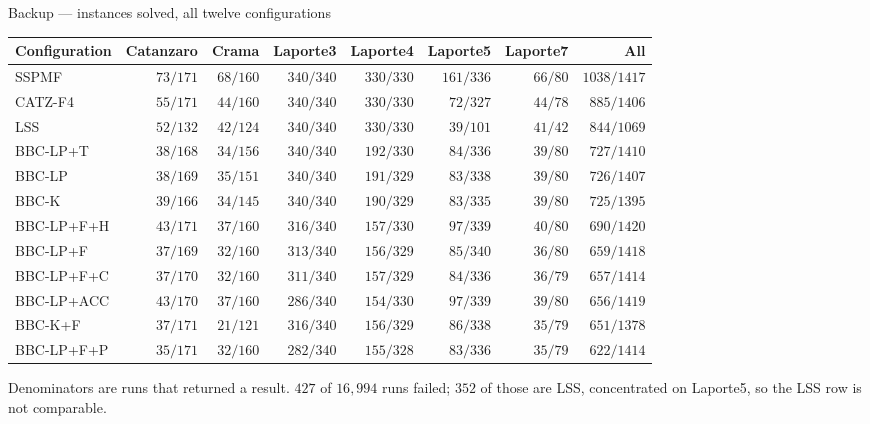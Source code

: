 \documentclass[11pt,aspectratio=169]{beamer}
\begin{document}
\begin{frame}{Backup --- instances solved, all twelve configurations}
\vspace{0.3em}
\centering\scriptsize
\setlength{\tabcolsep}{4pt}
\begin{tabular}{@{}lrrrrrrr@{}}
\toprule
Configuration & Catanzaro & Crama & Laporte3 & Laporte4 & Laporte5 & Laporte7 & All\\
\midrule
SSPMF              & $73/171$ & $68/160$ & $340/340$ & $330/330$ & $161/336$ & $66/80$ & $1038/1417$\\
CATZ-F4            & $55/171$ & $44/160$ & $340/340$ & $330/330$ & $72/327$  & $44/78$ & $885/1406$\\
LSS                & $52/132$ & $42/124$ & $340/340$ & $330/330$ & $39/101$  & $41/42$ & $844/1069$\\
\midrule
BBC-LP+T           & $38/168$ & $34/156$ & $340/340$ & $192/330$ & $84/336$  & $39/80$ & $727/1410$\\
BBC-LP             & $38/169$ & $35/151$ & $340/340$ & $191/329$ & $83/338$  & $39/80$ & $726/1407$\\
BBC-K              & $39/166$ & $34/145$ & $340/340$ & $190/329$ & $83/335$  & $39/80$ & $725/1395$\\
BBC-LP+F+H         & $43/171$ & $37/160$ & $316/340$ & $157/330$ & $97/339$  & $40/80$ & $690/1420$\\
BBC-LP+F           & $37/169$ & $32/160$ & $313/340$ & $156/329$ & $85/340$  & $36/80$ & $659/1418$\\
BBC-LP+F+C         & $37/170$ & $32/160$ & $311/340$ & $157/329$ & $84/336$  & $36/79$ & $657/1414$\\
BBC-LP+ACC         & $43/170$ & $37/160$ & $286/340$ & $154/330$ & $97/339$  & $39/80$ & $656/1419$\\
BBC-K+F            & $37/171$ & $21/121$ & $316/340$ & $156/329$ & $86/338$  & $35/79$ & $651/1378$\\
BBC-LP+F+P         & $35/171$ & $32/160$ & $282/340$ & $155/328$ & $83/336$  & $35/79$ & $622/1414$\\
\bottomrule
\end{tabular}
\vspace{0.5em}

{\scriptsize Denominators are runs that returned a result. $427$ of $16{,}994$ runs failed;
$352$ of those are LSS, concentrated on Laporte5, so the LSS row is not comparable.}
\end{frame}
\end{document}
